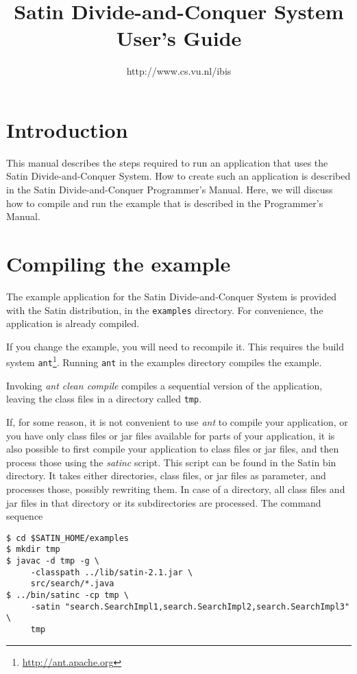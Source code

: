 \documentclass[a4paper,10pt]{article}
\begin{document}
\title{Satin Divide-and-Conquer System User's Guide}

\author{http://www.cs.vu.nl/ibis}

\maketitle

\section{Introduction}

This manual describes the steps required to run an application that
uses the Satin Divide-and-Conquer System. How to create such an application
is described in the Satin Divide-and-Conquer Programmer's Manual.
Here, we will discuss how to compile and run the example that is described
in the Programmer's Manual.

\section{Compiling the example}

The example application for the Satin Divide-and-Conquer System is
provided with the Satin distribution, in the \texttt{examples} directory.
For convenience, the application is already compiled.

If you change the example, you will need to recompile it. This
requires the build system \texttt{ant}\footnote{\url{http://ant.apache.org}}.
Running \texttt{ant} in the examples directory compiles the example.

Invoking \emph{ant clean compile} compiles a sequential version
of the application, 
leaving the class files in a directory called \texttt{tmp}.

If, for some reason, it is not convenient to use \emph{ant} to compile
your application, or you have only class files or jar files available
for parts of your application, it is also possible to first compile
your application to class files or jar files, and then process those
using the \emph{satinc} script. This script can be found in the Satin
bin directory. It takes either directories, class files, or jar files
as parameter, and processes those, possibly rewriting them. In case
of a directory, all class files and jar files in that directory or
its subdirectories are processed.  The command sequence

\begin{verbatim}
$ cd $SATIN_HOME/examples
$ mkdir tmp
$ javac -d tmp -g \
     -classpath ../lib/satin-2.1.jar \
     src/search/*.java
$ ../bin/satinc -cp tmp \
     -satin "search.SearchImpl1,search.SearchImpl2,search.SearchImpl3" \
     tmp
\end{verbatim}
\end{document}
